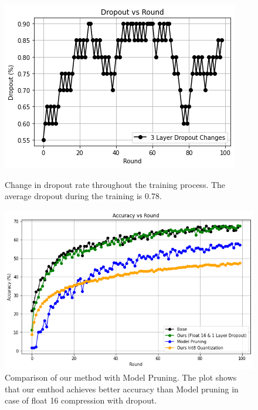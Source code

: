 \documentclass{article}
\begin{document}
\begin{figure}[ht]
  \centering
  \begin{minipage}{.45\textwidth}
    \centering
    \includegraphics[width=1.1\linewidth, height=.7\linewidth]{img/Drop_Round.png}
    \caption{Change in dropout rate throughout the training process. The average dropout during the training is 0.78.}
    \label{fig:dropout_training}
  \end{minipage}\hfill
  \begin{minipage}{.45\textwidth}
    \centering
    \includegraphics[width=\linewidth, height=0.7\linewidth]{img/comp.png}
    \caption{Comparison of our method with Model Pruning. The plot shows that our emthod achieves better accuracy than Model pruning in case of float 16 compression with dropout.}
    \label{fig:comp_pruning}
  \end{minipage}
\end{figure}
\end{document}
